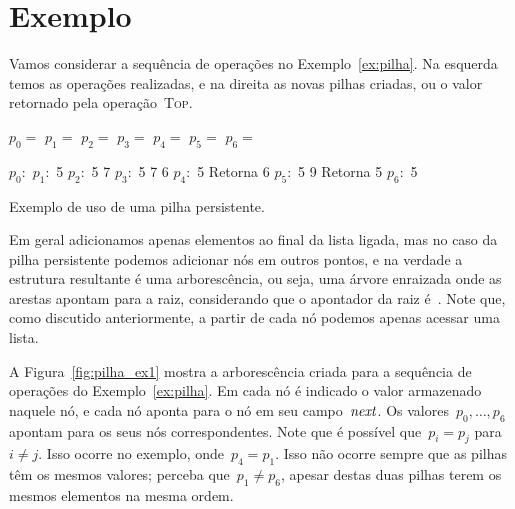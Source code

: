 \documentclass[../../main.tex]{subfiles}
\begin{document}
\section{Exemplo}

Vamos considerar a sequência de operações no Exemplo~\ref{ex:pilha}. Na esquerda temos as operações realizadas, e na direita as novas pilhas criadas, ou o valor retornado pela operação~\textsc{Top}.

\begin{table}
\centering

\begin{subalgorithm}{0.4\textwidth}
\begin{algorithmic}

\State $p_0 =$ 
\State $p_1 =$ 
\State $p_2 =$ 
\State $p_3 =$ 
\State $p_4 =$ 
\State {}
\State $p_5 =$ 
\State {}
\State $p_6 =$ 

\end{algorithmic}
\end{subalgorithm} \vrule
\begin{subalgorithm}{0.4\textwidth}
\begin{algorithmic}

\State $p_0:$
\State $p_1:$ 5
\State $p_2:$ 5 7
\State $p_3:$ 5 7 6
\State $p_4:$ 5
\State Retorna 6
\State $p_5:$ 5 9
\State Retorna 5
\State $p_6:$ 5

\end{algorithmic}
\end{subalgorithm}
\caption{Exemplo de uso de uma pilha persistente.} \label{ex:pilha}
\end{table}

Em geral adicionamos apenas elementos ao final da lista ligada, mas no caso da pilha persistente podemos adicionar nós em outros pontos, e na verdade a estrutura resultante é uma arborescência, ou seja, uma árvore enraizada onde as arestas apontam para a raiz, considerando que o apontador da raiz é~. Note que, como discutido anteriormente, a partir de cada nó podemos apenas acessar uma lista.

A Figura~\ref{fig:pilha_ex1} mostra a arborescência criada para a sequência de operações do Exemplo~\ref{ex:pilha}. Em cada nó é indicado o valor armazenado naquele nó, e cada nó aponta para o nó em seu campo~$\mathit{next}$. Os valores~$p_0, \ldots, p_6$ apontam para os seus nós correspondentes. Note que é possível que~${p_i = p_j}$ para~${i \neq j}$. Isso ocorre no exemplo, onde~$p_4 = p_1$. Isso não ocorre sempre que as pilhas têm os mesmos valores; perceba que~$p_1 \neq p_6$, apesar destas duas pilhas terem os mesmos elementos na mesma ordem.
\end{document}

